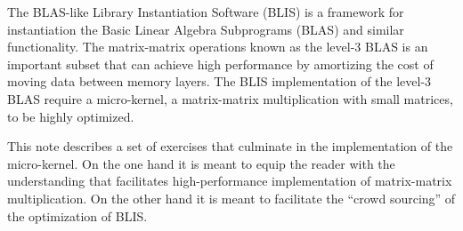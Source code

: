 The BLAS-like Library Instantiation Software (BLIS) is a framework for instantiation the Basic Linear Algebra Subprograms (BLAS) and similar functionality.  The matrix-matrix operations known as the level-3 BLAS is an important subset that can achieve high performance by amortizing the cost of moving data between memory layers.  The BLIS implementation of the level-3 BLAS require a micro-kernel, a matrix-matrix multiplication with small matrices, to be highly optimized.

This note describes a set of exercises that culminate in the implementation of the micro-kernel.  On the one hand it is meant to equip the reader with the understanding that facilitates high-performance implementation of matrix-matrix multiplication.  On the other hand it is meant to facilitate the ``crowd sourcing'' of the optimization of BLIS.


